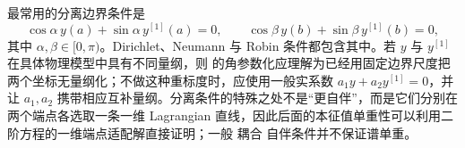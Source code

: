 \begin{example}[分离边界条件与量纲]
最常用的分离边界条件是
\begin{equation}\label{eq:math-sl-separated-bc}
 \cos\alpha\,y(a)+\sin\alpha\,y^{[1]}(a)=0,
 \qquad
 \cos\beta\,y(b)+\sin\beta\,y^{[1]}(b)=0,
\end{equation}
其中 $\alpha,\beta\in[0,\pi)$。Dirichlet、Neumann 与 Robin 条件都包含其中。若 $y$ 与 $y^{[1]}$ 在具体物理模型中具有不同量纲，则 的角参数化应理解为已经用固定边界尺度把两个坐标无量纲化；不做这种重标度时，应使用一般实系数 $a_1y+a_2y^{[1]}=0$，并让 $a_1,a_2$ 携带相应互补量纲。分离条件的特殊之处不是“更自伴”，而是它们分别在两个端点各选取一条一维 Lagrangian 直线，因此后面的本征值单重性可以利用二阶方程的一维端点适配解直接证明；一般 耦合 自伴条件并不保证谱单重。
\end{example}

